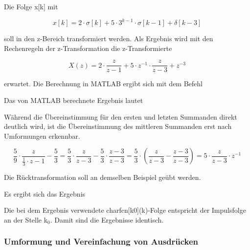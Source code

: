 \noindent Die Folge x[k] mit 

\begin{equation}\label{eq:fiveonehundredtwentyfour}
x\left[k\right]=2\cdot \sigma \left[k\right]+5\cdot 3^{k-1} \cdot \sigma \left[k-1\right]+\delta \left[k-3\right]
\end{equation}

\noindent soll in den z-Bereich transformiert werden. Als Ergebnis wird mit den Rechenregeln der z-Transformation die z-Transformierte 

\clearpage

\begin{equation}\label{eq:fiveonehundredtwentyfive}
X\left(z\right)=2\cdot \frac{z}{z-1} +5\cdot z^{-1} \cdot \frac{z}{z-3} +z^{-3}
\end{equation}

\noindent  erwartet. Die Berechnung in MATLAB ergibt sich mit dem Befehl



Das von MATLAB berechnete Ergebnis lautet



\noindent Während die Übereinstimmung für den ersten und letzten Summanden direkt deutlich wird, ist die Übereinstimmung des mittleren Summanden erst nach Umformungen erkennbar.

\begin{equation}\label{eq:fiveonehundredtwentysix}
\frac{5}{9} \cdot \frac{z}{\frac{1}{3} \cdot z-1} -\frac{5}{3} =\frac{5}{3} \cdot \frac{z}{z-3} -\frac{5}{3} \cdot \frac{z-3}{z-3} =\frac{5}{3} \cdot \left(\frac{z}{z-3} -\frac{z-3}{z-3} \right)=5\cdot \frac{z}{z-3} \cdot z^{-1}
\end{equation}

\noindent Die R\"{u}cktransformation soll an demselben Beispiel ge\"{u}bt werden. 



\noindent Es ergibt sich das Ergebnis



\noindent Die bei dem Ergebnis verwendete charfcn[k0](k)-Folge entspricht der Impulsfolge an der Stelle k$_{0}$. Damit sind die Ergebnisse identisch.

\clearpage

\subsubsection{Umformung und Vereinfachung von Ausdr\"{u}cken}

